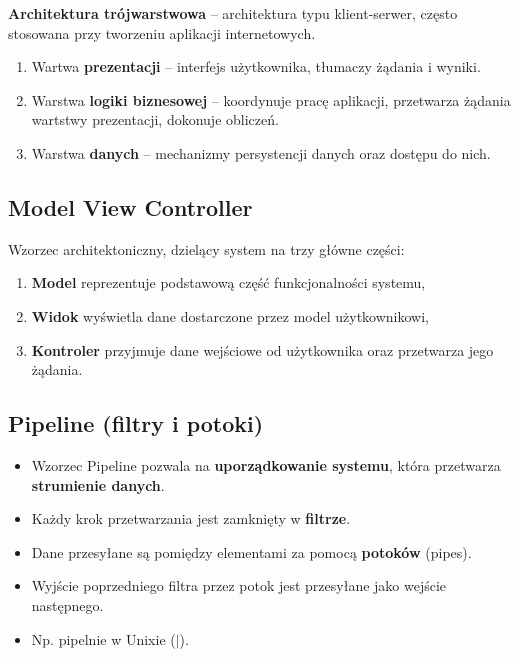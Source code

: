 \documentclass[main.tex]{subfiles}
\begin{document}
    \noindent \textbf{Architektura trójwarstwowa} -- architektura typu klient-serwer,
    często stosowana przy tworzeniu aplikacji internetowych.
    \begin{enumerate}[noitemsep]
        \item Wartwa \textbf{prezentacji} -- interfejs użytkownika, tłumaczy żądania i wyniki.
        \item Warstwa \textbf{logiki biznesowej} -- koordynuje pracę aplikacji, przetwarza żądania
        wartstwy prezentacji, dokonuje obliczeń.
        \item Warstwa \textbf{danych} -- mechanizmy persystencji danych oraz dostępu do nich.
    \end{enumerate}

    \subsection{Model View Controller}

    Wzorzec architektoniczny, dzielący system na trzy główne części:
    \begin{enumerate}[noitemsep]
        \item \textbf{Model} reprezentuje podstawową część funkcjonalności systemu,
        \item \textbf{Widok} wyświetla dane dostarczone przez model użytkownikowi,
        \item \textbf{Kontroler} przyjmuje dane wejściowe od użytkownika oraz przetwarza jego żądania.
    \end{enumerate}

    \subsection{Pipeline (filtry i potoki)}
    \begin{itemize}[noitemsep]
        \item  Wzorzec Pipeline pozwala na \textbf{uporządkowanie systemu}, która przetwarza
        \textbf{strumienie danych}.
        \item  Każdy krok przetwarzania jest zamknięty w \textbf{filtrze}.
        \item  Dane przesyłane są pomiędzy elementami za pomocą \textbf{potoków} (pipes).
        \item Wyjście poprzedniego filtra przez potok jest przesyłane jako wejście następnego.
        \item Np. pipelnie w Unixie ($|$).
    \end{itemize}
\end{document}
